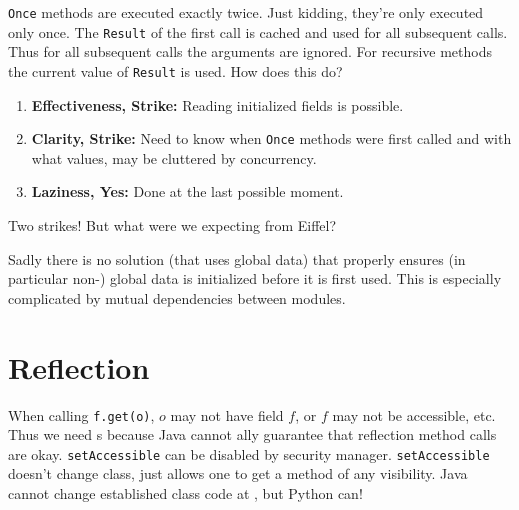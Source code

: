 \documentclass{article}
\begin{document}
\begin{definition}
  \texttt{Once} methods are executed exactly twice.
  Just kidding, they're only executed only once.
  The \texttt{Result} of the first call is cached and used for all subsequent calls.
  Thus for all subsequent calls the arguments are ignored.
  For recursive methods the current value of \texttt{Result} is used.
  How does this do?
  \begin{enumerate}
  \item \textbf{Effectiveness, Strike:} Reading initialized fields is possible.
  \item \textbf{Clarity, Strike:} Need to know when \texttt{Once} methods were first called and with what values, may be cluttered by concurrency.
  \item \textbf{Laziness, Yes:} Done at the last possible moment.
  \end{enumerate}
  Two strikes!
  But what were we expecting from Eiffel?
\end{definition}

Sadly there is no solution (that uses global data) that properly ensures (in particular non-\cringe{}) global data is initialized before it is first used.
This is especially complicated by mutual dependencies between modules.

\section{Reflection}

When calling \texttt{f.get(o)}, $o$ may not have field $f$,
or $f$ may not be accessible, etc.
Thus we need \runtimecheck{}s because Java cannot \static{}ally guarantee that reflection method calls are okay.
\texttt{setAccessible} can be disabled by security manager.
\texttt{setAccessible} doesn't change class, just allows one to get a method of any visibility.
Java cannot change established class code at \runtime{}, but Python can!
\end{document}
